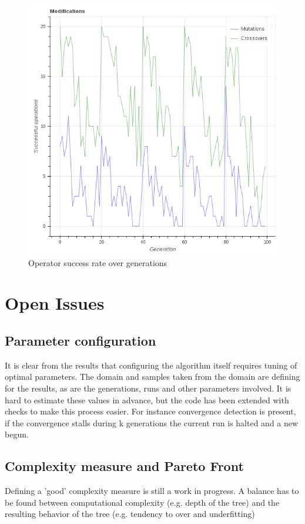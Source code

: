 \documentclass[10pt]{extarticle}
\begin{document}
\begin{figure}[H]
	\caption{Operator success rate over generations}
	\label{fig:operator2}
	\includegraphics[scale=0.3]{figures/operator2.png}
\end{figure}

\section{Open Issues}
\subsection{Parameter configuration}
It is clear from the results that configuring the algorithm itself requires tuning of optimal parameters. The domain and samples taken from the domain are defining for the results, as are the generations, runs and other parameters involved. It is hard to estimate these values in advance, but the code
has been extended with checks to make this process easier. For instance convergence detection is present, if the convergence stalls during k generations the current run is halted and a new begun.
\subsection{Complexity measure and Pareto Front}
Defining a 'good' complexity measure is still a work in progress. A balance has to be found between computational complexity (e.g. depth of the tree) and the resulting behavior of the tree (e.g. tendency to over and underfitting)
\end{document}
